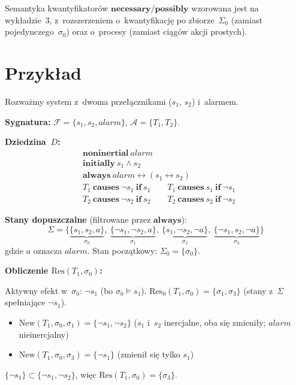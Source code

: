 \documentclass[11pt,a4paper]{article}
\newcommand{\causes}{\textbf{causes}}
\renewcommand{\iff}{\textbf{if}}
\newcommand{\initially}{\textbf{initially}}
\newcommand{\always}{\textbf{always}}
\newcommand{\noninertial}{\textbf{noninertial}}
\newcommand{\necessary}{\textbf{necessary}}
\newcommand{\possibly}{\textbf{possibly}}
\newcommand{\Res}{\mathrm{Res}}
\newcommand{\New}{\mathrm{New}}
\newcommand{\Ac}{\mathcal{A}}
\newcommand{\F}{\mathcal{F}}
\begin{document}
Semantyka kwantyfikatorów $\necessary / \possibly$ wzorowana jest na
wykładzie~3, z~rozszerzeniem o~kwantyfikację po zbiorze~$\Sigma_0$
(zamiast pojedynczego~$\sigma_0$) oraz o~procesy (zamiast ciągów akcji
prostych).

\section{Przykład}

Rozważmy system z~dwoma przełącznikami ($s_1$, $s_2$) i~alarmem.

\medskip
\noindent\textbf{Sygnatura:}
$\F = \{s_1, s_2, \mathit{alarm}\}$, \quad
$\Ac = \{T_1, T_2\}$.

\medskip
\noindent\textbf{Dziedzina~$D$:}
\begin{align*}
  &\noninertial\ \mathit{alarm} \\
  &\initially\ s_1 \land s_2 \\
  &\always\ \mathit{alarm} \leftrightarrow (s_1 \leftrightarrow s_2) \\
  &T_1\ \causes\ \neg s_1\ \iff\ s_1
  \qquad T_1\ \causes\ s_1\ \iff\ \neg s_1 \\
  &T_2\ \causes\ \neg s_2\ \iff\ s_2
  \qquad T_2\ \causes\ s_2\ \iff\ \neg s_2
\end{align*}

\noindent\textbf{Stany dopuszczalne} (filtrowane przez $\always$):
\[
  \Sigma = \{
    \underbrace{\{s_1, s_2, a\}}_{\sigma_0},\
    \underbrace{\{\neg s_1, \neg s_2, a\}}_{\sigma_1},\
    \underbrace{\{s_1, \neg s_2, \neg a\}}_{\sigma_2},\
    \underbrace{\{\neg s_1, s_2, \neg a\}}_{\sigma_3}
  \}
\]
gdzie $a$ oznacza $\mathit{alarm}$.
Stan początkowy: $\Sigma_0 = \{\sigma_0\}$.

\medskip
\noindent\textbf{Obliczenie $\Res(T_1, \sigma_0)$:}

Aktywny efekt w~$\sigma_0$: $\neg s_1$ (bo $\sigma_0 \models s_1$).
$\Res_0(T_1, \sigma_0) = \{\sigma_1, \sigma_3\}$ (stany z~$\Sigma$ spełniające $\neg s_1$).
\begin{itemize}
  \item $\New(T_1, \sigma_0, \sigma_1) = \{\neg s_1, \neg s_2\}$
    \quad ($s_1$ i~$s_2$ inercjalne, oba się zmieniły; $\mathit{alarm}$ nieinercjalny)
  \item $\New(T_1, \sigma_0, \sigma_3) = \{\neg s_1\}$
    \quad (zmienił się tylko $s_1$)
\end{itemize}
$\{\neg s_1\} \subset \{\neg s_1, \neg s_2\}$, więc
$\Res(T_1, \sigma_0) = \{\sigma_3\}$.
\end{document}
